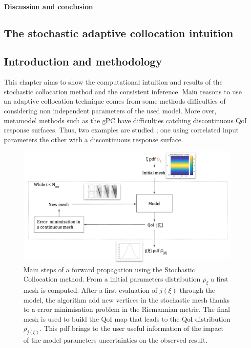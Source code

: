 \documentclass[11pt, a4paper, English]{report}
\begin{document}
\subsubsection{Discussion and conclusion}
\begin{appendix}
\color{blue!40!black}\chapter{The stochastic adaptive collocation intuition}\color{black}
\section{Introduction and methodology}
This chapter aims to show the computational intuition and results of the stochastic collocation method and the consistent inference. Main reasons to use an adaptive collocation technique comes from some methods difficulties of considering non independent parameters of the used model. More over, metamodel methods such as the gPC have difficulties catching discontinuous QoI response surfaces. Thus, two examples are studied ; one using correlated input parameters the other with a discontinuous response surface. %
\begin{figure}[h!]
    \centering
    \includegraphics[width=\textwidth]{schfp.png}
    \caption{Main steps of a forward propagation using the Stochastic Collocation method. From a initial parameters distribution $\rho_\xi$ a first mesh is computed. After a first evaluation of $j(\xi)$ through the model, the algorithm add new vertices in the stochastic mesh thanks to a error minimisation problem in the Riemannian metric. The final mesh is used to build the QoI map that leads to the QoI distribution $\rho_{j(\xi)}$. This pdf brings to the user useful information of the impact of the model parameters uncertainties on the observed result.}
    \label{SCschema}
\end{figure}

\end{appendix}
\end{document}
